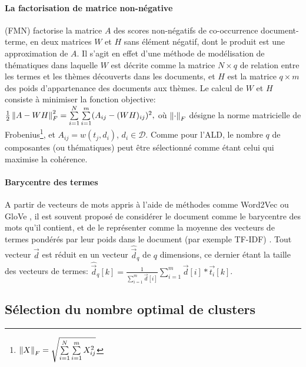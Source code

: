 \paragraph[NMF]{La factorisation de matrice non-négative} (FMN) \citep{paatero1994nmf} factorise la matrice $A$ des scores non-négatifs de co-occurrence document-terme, en deux matrices $W$ et $H$ sans élément négatif, dont le produit est une approximation de $A$. Il s'agit en effet d'une méthode de modélisation de thématiques dans laquelle $W$ est décrite comme la matrice $N\times q$ de relation entre les termes et les thèmes découverts dans les documents, et $H$ est la matrice $q\times m$ des poids d'appartenance des documents aux thèmes. Le calcul de $W$ et $H$ consiste à minimiser la fonction objective: $\frac{1}{2}\left\lVert A - WH\right\rVert^2_F = \sum\limits_{i=1}^N\sum\limits_{i=1}^m (A_{ij} - (WH)_{ij})^2,$ où $\left\lVert\cdot\right\rVert_F$ désigne la norme matricielle de Frobenius\footnote{$\left\lVert X\right\rVert_F = \sqrt{\sum\limits_{i=1}^N\sum\limits_{i=1}^m X_{ij}^2}$}, et $A_{ij} = w(t_j, d_i)$, $d_i \in \mathcal{D}$.  %
Comme pour l'ALD, le nombre $q$ de composantes (ou thématiques) peut être sélectionné comme étant celui qui  maximise la cohérence. 


\paragraph[w2v*TF-IDF]{Barycentre des termes}
A partir de vecteurs de mots appris à l'aide de méthodes comme Word2Vec \citep{mikolov2013word2vec} ou GloVe \citep{pennington2014glove}, il est souvent proposé de considérer le document comme le barycentre des mots qu'il contient, et de le représenter comme la moyenne des vecteurs de termes pondérés par leur poids dans le document (par exemple TF-IDF) \citep{lemikolov2014word2vec, charlet2018simbow_coria,arora2017wordAvgSentEmbedd}. Tout vecteur $\vec{d}$ est réduit en un vecteur $\hat{\vec{d}}_q$ de $q$ dimensions, ce dernier étant la taille des vecteurs de termes: $\hat{\vec{d}}_q[k] = \frac{1}{\sum\limits_{i=1}^m \vec{d}[i]} \sum\limits_{i=1}^{m}\vec{d}[i]*\vec{t_i}[k]$.

\subsection{Sélection du nombre optimal de clusters}
\label{sec:similarite:k-optimal}

